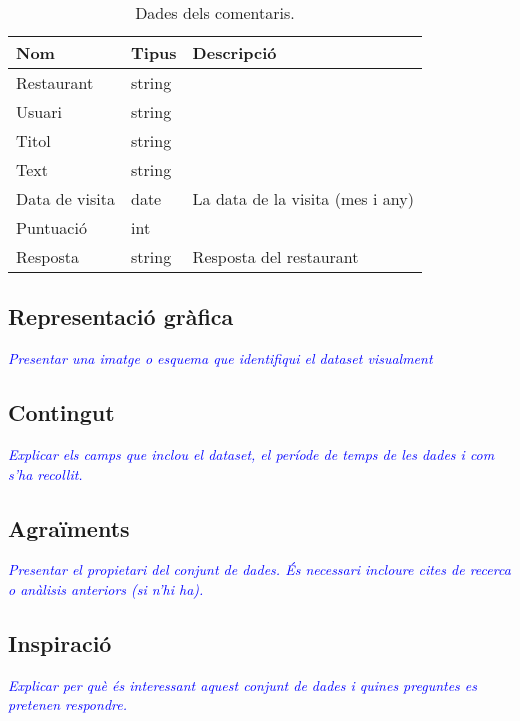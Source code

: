\documentclass{article}
\newcommand\enunciat[2][blue]{\textcolor{#1}{\emph{#2}}}
\begin{document}
\begin{table} %
    \begin{tabular}{|l|l|l|}
        Nom            & Tipus  & Descripció \\\hline\hline
        Restaurant     & string & \\\hline
        Usuari         & string & \\\hline
        Titol          & string & \\\hline
        Text           & string & \\\hline
        Data de visita & date   & La data de la visita (mes i any) \\\hline
        Puntuació      & int    & \\\hline
        Resposta       & string & Resposta del restaurant \\\hline
    \end{tabular}
    \caption{Dades dels comentaris.}
    \label{table:dataset2_data}
\end{table}

\subsection{Representació gràfica}
\enunciat{Presentar una imatge o esquema que identifiqui el dataset visualment}

\subsection{Contingut}
\enunciat{Explicar els camps que inclou el dataset, el període de temps de les
dades i com s'ha recollit.}

\subsection{Agraïments}
\enunciat{Presentar el propietari del conjunt de dades. És necessari incloure
cites de recerca o anàlisis anteriors (si n'hi ha).}

\subsection{Inspiració}
\enunciat{Explicar per què és interessant aquest conjunt de dades i quines
preguntes es pretenen respondre.}
\end{document}
